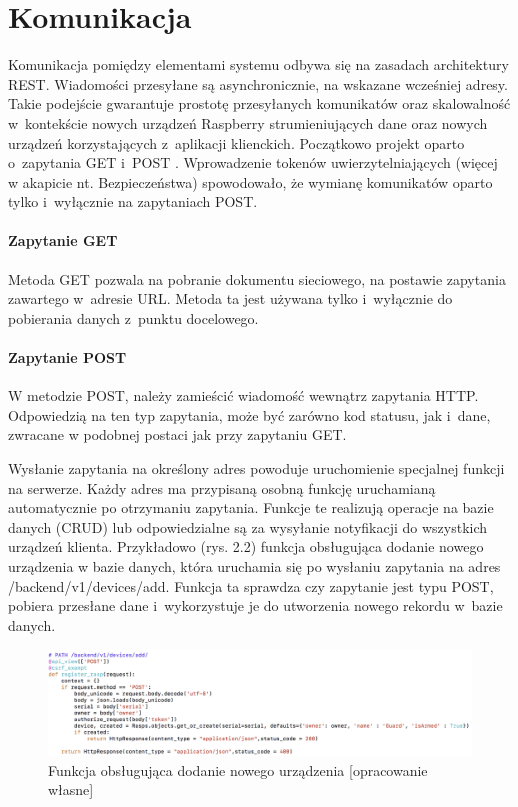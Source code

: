 \section{Komunikacja}

Komunikacja pomiędzy elementami systemu odbywa się na zasadach architektury REST. Wiadomości przesyłane są asynchronicznie, na wskazane wcześniej adresy.
Takie podejście gwarantuje prostotę przesyłanych komunikatów oraz skalowalność w~kontekście nowych urządzeń Raspberry strumieniujących dane oraz nowych urządzeń korzystających z~aplikacji klienckich. Początkowo projekt oparto o~zapytania GET i~POST \cite{WEBARCH}. Wprowadzenie tokenów uwierzytelniających (więcej w akapicie nt. Bezpieczeństwa) spowodowało, że wymianę komunikatów oparto tylko i~wyłącznie na zapytaniach POST. 

\paragraph{Zapytanie GET}
Metoda GET pozwala na pobranie dokumentu sieciowego, na postawie zapytania zawartego w~adresie URL. Metoda ta jest używana tylko i~wyłącznie do pobierania danych z~punktu docelowego. 

\paragraph{Zapytanie POST}
W metodzie POST, należy zamieścić wiadomość wewnątrz zapytania HTTP. Odpowiedzią na ten typ zapytania, może być zarówno kod statusu, jak i~dane, zwracane w podobnej postaci jak przy zapytaniu GET.

Wysłanie zapytania na określony adres powoduje uruchomienie specjalnej funkcji na serwerze. Każdy adres ma przypisaną osobną funkcję uruchamianą automatycznie po otrzymaniu zapytania. Funkcje te realizują operacje na bazie danych (CRUD) lub odpowiedzialne są za wysyłanie notyfikacji do wszystkich urządzeń klienta. Przykładowo (rys. 2.2) funkcja obsługująca dodanie nowego urządzenia w bazie danych, która uruchamia się po wysłaniu zapytania na adres /backend/v1/devices/add. Funkcja ta sprawdza czy zapytanie jest typu POST, pobiera przesłane dane i~wykorzystuje je do utworzenia nowego rekordu w~bazie danych.
\begin{figure}[ht] 
   \centering
   \includegraphics[width=14cm]{backend.png} 
   \caption{Funkcja obsługująca dodanie nowego urządzenia [opracowanie własne]}
\end{figure}

